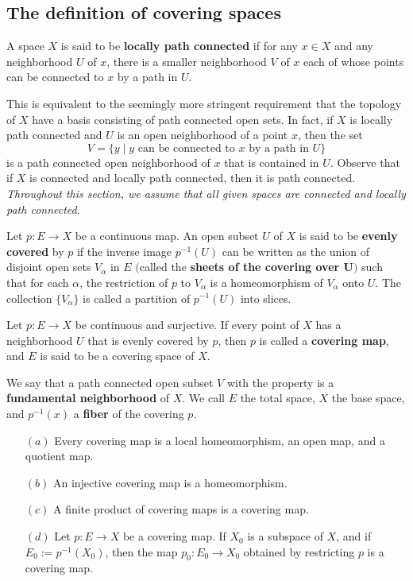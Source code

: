 \subsection{The definition of covering spaces}
\begin{definition}
A space $X$ is said to be \textbf{locally path connected} if for any $x\in X$ and any neighborhood $U$ of $x$, there is a smaller neighborhood $V$ of $x$ each of whose points can be connected to $x$ by a path in $U$.
\end{definition}
This is equivalent to the seemingly more stringent requirement that the topology of $X$ have a basis consisting of path connected open sets. In fact, if $X$ is locally path connected and $U$ is an open neighborhood of a point $x$, then the set
\[V=\{y\mid y\text{ can be connected to $x$ by a path in $U$}\}\]
is a path connected open neighborhood of $x$ that is contained in $U$. Observe that if $X$ is connected and locally path connected, then it is path connected. \textit{Throughout this section, we assume that all given spaces are connected and locally path connected}.
\begin{definition}
Let $p:E\to X$ be a continuous map. An open subset $U$ of $X$ is said to be \textbf{evenly covered} by $p$ if the inverse image $p^{-1}(U)$ can be written as the union of disjoint open sets $V_\alpha$ in $E$ $($called the \textbf{sheets of the covering over $\bm{U}$}$)$ such that for each $\alpha$, the restriction of $p$ to $V_\alpha$ is a homeomorphism of $V_\alpha$ onto $U$. The collection $\{V_\alpha\}$ is called a partition of $p^{-1}(U)$ into slices.
\end{definition}
\begin{definition}
Let $p:E\to X$ be continuous and surjective. If every point of $X$ has a
neighborhood $U$ that is evenly covered by $p$, then $p$ is called a \textbf{covering map}, and $E$ is said to be a covering space of $X$.\par
We say that a path connected open subset $V$ with the property is a \textbf{fundamental neighborhood} of $X$. We call $E$ the total space, $X$ the base space, and $p^{-1}(x)$ a \textbf{fiber} of the covering $p$.
\end{definition}
\begin{proposition}
\mbox{}
\begin{itemize}
\item[$(a)$] Every covering map is a local homeomorphism, an open map, and a quotient
map.
\item[$(b)$] An injective covering map is a homeomorphism.
\item[$(c)$] A finite product of covering maps is a covering map.
\item[$(d)$] Let $p:E\to X$ be a covering map. If $X_0$ is a subspace of $X$, and if $E_0:=p^{-1}(X_0)$, then the map $p_0:E_0\to X_0$ obtained by restricting $p$ is a 
covering map.
\end{itemize}
\end{proposition}
